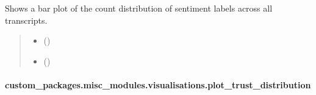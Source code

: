 \documentclass[letterpaper,10pt,english]{sphinxhowto}
\begin{document}
\begin{fulllineitems}
\label{\detokenize{_autosummary/custom_packages.misc_modules.visualisations.plot_sentiment_distribution:custom_packages.misc_modules.visualisations.plot_sentiment_distribution}}
\pysigstartsignatures
\pysiglinewithargsret
{}
{\sphinxparamcomma {}}
{}
\pysigstopsignatures
\sphinxAtStartPar
Shows a bar plot of the count distribution of sentiment labels across all transcripts.
\begin{quote}\begin{description}
\begin{itemize}
\item {} 
\sphinxAtStartPar
{} ()

\item {} 
\sphinxAtStartPar
{} ()

\end{itemize}

\sphinxAtStartPar
{}

\end{description}\end{quote}

\end{fulllineitems}


\sphinxstepscope


\paragraph{custom\_packages.misc\_modules.visualisations.plot\_trust\_distribution}
\label{\detokenize{_autosummary/custom_packages.misc_modules.visualisations.plot_trust_distribution:custom-packages-misc-modules-visualisations-plot-trust-distribution}}\label{\detokenize{_autosummary/custom_packages.misc_modules.visualisations.plot_trust_distribution::doc}}
\end{document}
